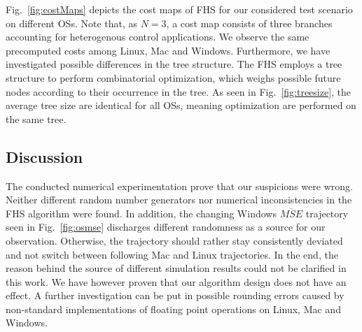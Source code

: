 Fig.~\ref{fig:costMaps} depicts the cost maps of FHS for our considered test
scenario on different OSs. Note that, as $N=3$, a cost map consists of three
branches accounting for heterogenous control applications. We observe the same
precomputed costs among Linux, Mac and Windows. Furthermore, we have
investigated possible differences in the tree structure. The FHS employs a tree
structure to perform combinatorial optimization, which weighs possible future
nodes according to their occurrence in the tree. As seen in
Fig.~\ref{fig:treesize}, the average tree size are identical for all OSs, meaning
optimization are performed on the same tree. 

\subsection{Discussion}

The conducted numerical experimentation prove that our suspicions were wrong.
Neither different random number generators nor numerical inconsistencies in the
FHS algorithm were found. In addition, the changing Windows $\overline{MSE}$
trajectory seen in Fig.~\ref{fig:osmse} discharges different randomness as a
source for our observation. Otherwise, the trajectory should rather stay
consistently deviated and not switch between following Mac and Linux
trajectories. In the end, the reason behind the source of different simulation
results could not be clarified in this work. We have however proven that our
algorithm design does not have an effect. A further investigation can be put in
possible rounding errors caused by non-standard implementations of floating
point operations on Linux, Mac and Windows.
